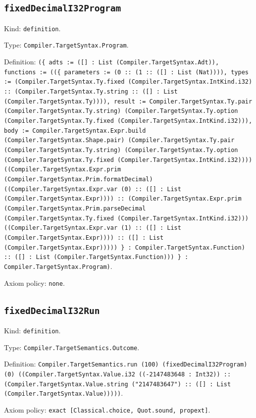\documentclass[11pt]{article}
\begin{document}
\subsection*{\texttt{fixedDecimalI32Program}}
\noindent Kind: \texttt{definition}.\par
\noindent Type: \texttt{Compiler.TargetSyntax.Program}.\par
\noindent Definition: \texttt{(\{ adts := ([] : List (Compiler.TargetSyntax.Adt)), functions := ((\{ parameters := (0 :: (1 :: ([] : List (Nat)))), types := (Compiler.TargetSyntax.Ty.fixed (Compiler.TargetSyntax.IntKind.i32) :: (Compiler.TargetSyntax.Ty.string :: ([] : List (Compiler.TargetSyntax.Ty)))), result := Compiler.TargetSyntax.Ty.pair (Compiler.TargetSyntax.Ty.string) (Compiler.TargetSyntax.Ty.option (Compiler.TargetSyntax.Ty.fixed (Compiler.TargetSyntax.IntKind.i32))), body := Compiler.TargetSyntax.Expr.build (Compiler.TargetSyntax.Shape.pair) (Compiler.TargetSyntax.Ty.pair (Compiler.TargetSyntax.Ty.string) (Compiler.TargetSyntax.Ty.option (Compiler.TargetSyntax.Ty.fixed (Compiler.TargetSyntax.IntKind.i32)))) ((Compiler.TargetSyntax.Expr.prim (Compiler.TargetSyntax.Prim.formatDecimal) ((Compiler.TargetSyntax.Expr.var (0) :: ([] : List (Compiler.TargetSyntax.Expr)))) :: (Compiler.TargetSyntax.Expr.prim (Compiler.TargetSyntax.Prim.parseDecimal (Compiler.TargetSyntax.Ty.fixed (Compiler.TargetSyntax.IntKind.i32))) ((Compiler.TargetSyntax.Expr.var (1) :: ([] : List (Compiler.TargetSyntax.Expr)))) :: ([] : List (Compiler.TargetSyntax.Expr))))) \} : Compiler.TargetSyntax.Function) :: ([] : List (Compiler.TargetSyntax.Function))) \} : Compiler.TargetSyntax.Program)}.\par
\noindent Axiom policy: \texttt{none}.\par
\subsection*{\texttt{fixedDecimalI32Run}}
\noindent Kind: \texttt{definition}.\par
\noindent Type: \texttt{Compiler.TargetSemantics.Outcome}.\par
\noindent Definition: \texttt{Compiler.TargetSemantics.run (100) (fixedDecimalI32Program) (0) ((Compiler.TargetSyntax.Value.i32 ((-2147483648 : Int32)) :: (Compiler.TargetSyntax.Value.string ("2147483647") :: ([] : List (Compiler.TargetSyntax.Value)))))}.\par
\noindent Axiom policy: \texttt{exact [Classical.choice, Quot.sound, propext]}.\par
\end{document}
